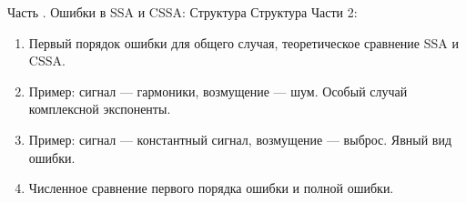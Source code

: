 \documentclass[10pt, ucs, notheorems, handout]{beamer}
\newcommand{\RomanNumeralCaps}[1]
{\MakeUppercase{\romannumeral #1}}
\begin{document}
\begin{frame}{Часть \RomanNumeralCaps{2}. Ошибки в SSA и CSSA: Структура}
	Структура Части 2:

\vspace{1em}
	\begin{enumerate}
		\item Первый порядок ошибки для общего случая, теоретическое сравнение SSA и CSSA.

\vspace{1em}
		\item Пример: сигнал --- гармоники, возмущение --- шум. Особый случай комплексной экспоненты.

\vspace{1em}
		\item Пример: сигнал --- константный сигнал, возмущение --- выброс. Явный вид ошибки.

\vspace{1em}
		\item Численное сравнение первого порядка ошибки и полной ошибки.
	\end{enumerate}
\end{frame}
\end{document}
